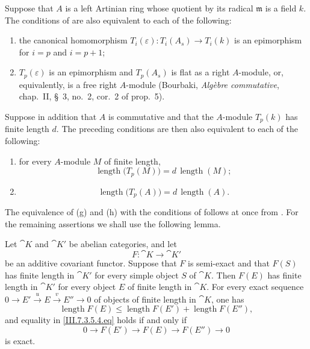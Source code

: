 \begin{proposition}[7.3.5]
\label{III.7.3.5}
Suppose that $A$ is a left Artinian ring whose quotient by its
radical $\mathfrak m$ is a field $k$.  The conditions of
 are also equivalent to each of the following:
\begin{enumerate}
  \item[(g)] the canonical homomorphism $T_i(\varepsilon):T_i(A_s)\longrightarrow T_i(k)$
    is an epimorphism for $i=p$ and $i=p+1$;
  \item[(h)] $T_p(\varepsilon)$ is an epimorphism and
    $T_p(A_s)$ is flat as a right $A$-module, or, equivalently,
    is a free right $A$-module \textup{(Bourbaki,
    \emph{Alg\`ebre commutative}, chap.~II, \S~3, no.~2,
    cor.~2 of prop.~5)}.
\end{enumerate}
Suppose in addition that $A$ is commutative and that the
$A$-module $T_p(k)$ has finite length $d$.  The preceding
conditions are then also equivalent to each of the following:
\begin{enumerate}
  \item[(i)] for every $A$-module $M$ of finite length,
    \[
      \operatorname{length}\bigl(T_p(M)\bigr)
      =
      d\,\operatorname{length}(M);
      \tag{7.3.5.1}\label{III.7.3.5.1.eq}
    \]
  \item[(j)]
    \[
      \operatorname{length}\bigl(T_p(A)\bigr)
      =
      d\,\operatorname{length}(A).
      \tag{7.3.5.2}\label{III.7.3.5.2.eq}
    \]
\end{enumerate}
\end{proposition}

The equivalence of (g) and (h) with the conditions of
 follows at once from .  For
the remaining assertions we shall use the following lemma.

\begin{lemma}[7.3.5.3]
\label{III.7.3.5.3}
Let $\cat{K}$ and $\cat{K}'$ be abelian categories, and let
\[
  F:\cat{K}\longrightarrow\cat{K}'
\]
be an additive covariant functor.  Suppose that $F$ is
semi-exact and that $F(S)$ has finite length in $\cat{K}'$ for
every simple object $S$ of $\cat{K}$.  Then $F(E)$ has finite
length in $\cat{K}'$ for every object $E$ of finite length in
$\cat{K}$.  For every exact sequence $0\longrightarrow E'\xrightarrow{u}E\xrightarrow{v}E''\longrightarrow0$
of objects of finite length in $\cat{K}$, one has
\[
  \operatorname{length}F(E)
  \leq
  \operatorname{length}F(E')
  +
  \operatorname{length}F(E''),
  \tag{7.3.5.4}\label{III.7.3.5.4.eq}
\]
and equality in \eqref{III.7.3.5.4.eq} holds if and only if
\[
  0\longrightarrow F(E')
  \longrightarrow F(E)
  \longrightarrow F(E'')
  \longrightarrow0
\]
is exact.
\end{lemma}

